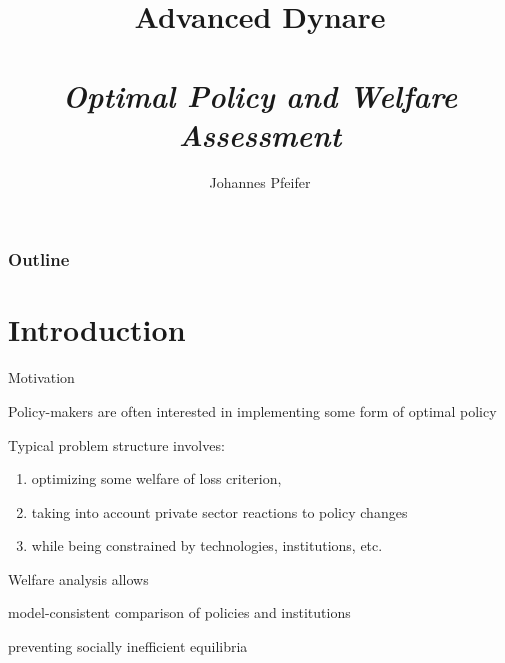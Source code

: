 \documentclass[handout,usepdftitle=false,xcolor=dvipsnames,aspectratio=169]{beamer}
\begin{document}
\title[]{\textbf{Advanced Dynare\\}
  \\
  \emph{Optimal Policy and Welfare Assessment}
}

\author{Johannes Pfeifer}




\maketitle
%
\begin{frame}
  \frametitle{Outline}
  \tableofcontents%
\end{frame}



\section{Introduction}

\begin{frame}{Motivation}
  \begin{witemize}
    \item Policy-makers are often interested in implementing some form of optimal policy
    \item Typical problem structure involves:
    \begin{enumerate}
      \item optimizing some welfare of loss criterion,
      \item taking into account private sector reactions to policy changes
      \item while being constrained by technologies, institutions, etc.
    \end{enumerate}
    \item Welfare analysis allows
    \begin{witemize}
      \item model-consistent comparison of policies and institutions
      \item preventing socially inefficient equilibria
    \end{witemize}
  \end{witemize}
\end{frame}
\end{document}
